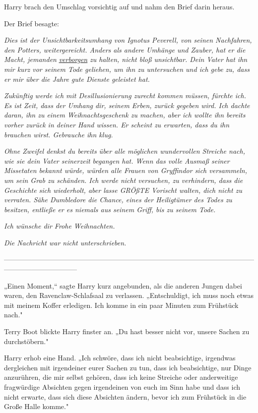 {Harry brach den Umschlag vorsichtig auf und nahm den Brief darin heraus.

Der Brief besagte:

\emph{Dies ist der Unsichtbarkeitsumhang von Ignotus Peverell, von seinen Nachfahren, den Potters, weitergereicht. Anders als andere Umhänge und Zauber, hat er die Macht, jemanden} \emph{\uline{verborgen}} \emph{zu halten, nicht bloß unsichtbar. Dein Vater hat ihn mir kurz vor seinem Tode geliehen, um ihn zu untersuchen und ich gebe zu, dass er mir über die Jahre gute Dienste geleistet hat.}

\emph{Zukünftig werde ich mit Desillusionierung zurecht kommen müssen, fürchte ich. Es ist Zeit, dass der Umhang dir, seinem Erben, zurück gegeben wird. Ich dachte daran, ihn zu einem Weihnachtsgeschenk zu machen, aber ich wollte ihn bereits vorher zurück in deiner Hand wissen. Er scheint zu erwarten, dass du ihn brauchen wirst. Gebrauche ihn klug.}

\emph{Ohne Zweifel denkst du bereits über alle möglichen wundervollen Streiche nach, wie sie dein Vater seinerzeit begangen hat. Wenn das volle Ausmaß seiner Missetaten bekannt würde, würden alle Frauen von Gryffindor sich versammeln, um sein Grab zu schänden. Ich werde nicht versuchen, zu verhindern, dass die Geschichte sich wiederholt, aber lasse GRÖßTE Vorischt walten, dich nicht zu verraten. Sähe Dumbledore die Chance, eines der Heiligtümer des Todes zu besitzen, entließe er es niemals aus seinem Griff, bis zu seinem Tode.}

\emph{Ich wünsche dir Frohe Weihnachten.}

\emph{Die Nachricht war nicht unterschrieben.}

--------------------------------------------------------------------------------------------------------------------------------------------

\hfill\break „Einen Moment,“ sagte Harry kurz angebunden, als die anderen Jungen dabei waren, den Ravenclaw-Schlafsaal zu verlassen. „Entschuldigt, ich muss noch etwas mit meinem Koffer erledigen. Ich komme in ein paar Minuten zum Frühstück nach."

Terry Boot blickte Harry finster an. „Du hast besser nicht vor, unsere Sachen zu durchstöbern."

Harry erhob eine Hand. „Ich schwöre, dass ich nicht beabsichtige, irgendwas dergleichen mit irgendeiner eurer Sachen zu tun, dass ich beabsichtige, nur Dinge anzurühren, die mir selbst gehören, dass ich keine Streiche oder anderweitige fragwürdige Absichten gegen irgendeinen von euch im Sinn habe und dass ich nicht erwarte, dass sich diese Absichten ändern, bevor ich zum Frühstück in die Große Halle komme."

}

